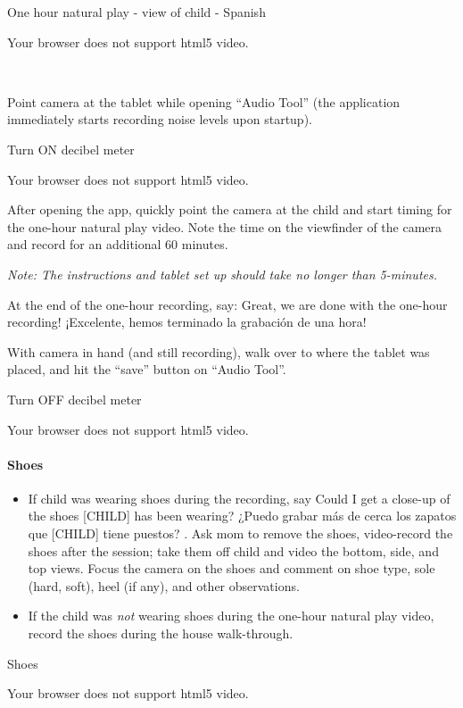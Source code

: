 \documentclass[
]{book}
\providecommand{\tightlist}{%
  \setlength{\itemsep}{0pt}\setlength{\parskip}{0pt}}
\begin{document}
One hour natural play - view of child - Spanish

Your browser does not support html5 video.

 

Point camera at the tablet while opening ``Audio Tool'' (the application immediately starts recording noise levels upon startup).

Turn ON decibel meter

Your browser does not support html5 video.

After opening the app, quickly point the camera at the child and start timing for the one-hour natural play video. Note the time on the viewfinder of the camera and record for an additional 60 minutes.

\emph{Note: The instructions and tablet set up should take no longer than 5-minutes.}

At the end of the one-hour recording, say: Great, we are done with the one-hour recording! ¡Excelente, hemos terminado la grabación de una hora!

With camera in hand (and still recording), walk over to where the tablet was placed, and hit the ``save'' button on ``Audio Tool''.

Turn OFF decibel meter

Your browser does not support html5 video.

\hypertarget{shoes}{%
\paragraph{Shoes}\label{shoes}}

\begin{itemize}
\tightlist
\item
  If child was wearing shoes during the recording, say Could I get a close-up of the shoes {[}CHILD{]} has been wearing? ¿Puedo grabar más de cerca los zapatos que {[}CHILD{]} tiene puestos? . Ask mom to remove the shoes, video-record the shoes after the session; take them off child and video the bottom, side, and top views. Focus the camera on the shoes and comment on shoe type, sole (hard, soft), heel (if any), and other observations.
\item
  If the child was \emph{not} wearing shoes during the one-hour natural play video, record the shoes during the house walk-through.
\end{itemize}

Shoes

Your browser does not support html5 video.
\end{document}
